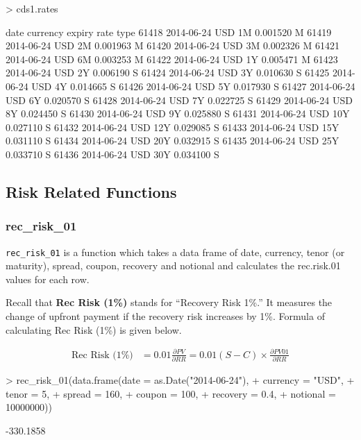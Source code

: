 \documentclass{jss}
\renewenvironment{Schunk}{\vspace{\topsep}}{\vspace{\topsep}}
\begin{document}
\begin{Schunk}
\begin{Sinput}
> cds1.rates
\end{Sinput}
\begin{Soutput}
            date currency expiry     rate type
61418 2014-06-24      USD     1M 0.001520    M
61419 2014-06-24      USD     2M 0.001963    M
61420 2014-06-24      USD     3M 0.002326    M
61421 2014-06-24      USD     6M 0.003253    M
61422 2014-06-24      USD     1Y 0.005471    M
61423 2014-06-24      USD     2Y 0.006190    S
61424 2014-06-24      USD     3Y 0.010630    S
61425 2014-06-24      USD     4Y 0.014665    S
61426 2014-06-24      USD     5Y 0.017930    S
61427 2014-06-24      USD     6Y 0.020570    S
61428 2014-06-24      USD     7Y 0.022725    S
61429 2014-06-24      USD     8Y 0.024450    S
61430 2014-06-24      USD     9Y 0.025880    S
61431 2014-06-24      USD    10Y 0.027110    S
61432 2014-06-24      USD    12Y 0.029085    S
61433 2014-06-24      USD    15Y 0.031110    S
61434 2014-06-24      USD    20Y 0.032915    S
61435 2014-06-24      USD    25Y 0.033710    S
61436 2014-06-24      USD    30Y 0.034100    S
\end{Soutput}
\end{Schunk}

\subsection{Risk Related Functions}

\subsubsection{rec\_risk\_01}

\texttt{rec\_risk\_01} is a function which takes a data frame of date, currency, tenor (or maturity), spread, coupon, recovery and notional and calculates the rec.risk.01 values for each row. 

Recall that \textbf{Rec Risk (1\%)} stands for ``Recovery Risk 1\%.'' It measures the change of upfront payment if the recovery risk increases by 1\%. Formula of calculating Rec Risk (1\%) is given below.

\begin{align*}
  \text{Rec Risk (1\%)} &= 0.01 \frac{\partial PV}{\partial RR} = 0.01 (S - C) \times \frac{\partial PV01}{\partial RR}
\end{align*}

\begin{Schunk}
\begin{Sinput}
> rec_risk_01(data.frame(date     = as.Date("2014-06-24"),
+                        currency = "USD",
+                        tenor    = 5,
+                        spread   = 160,
+                        coupon   = 100,
+                        recovery = 0.4,
+                        notional = 10000000))
\end{Sinput}
\begin{Soutput}
[1] -330.1858
\end{Soutput}
\end{Schunk}
\end{document}
